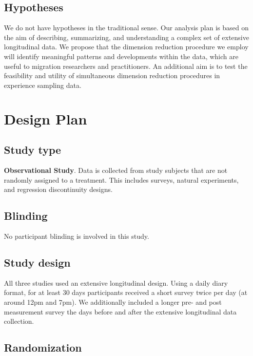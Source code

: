 \documentclass[]{article}
\begin{document}
\hypertarget{hypotheses}{%
\subsection{Hypotheses}\label{hypotheses}}

We do not have hypotheses in the traditional sense. Our analysis plan is
based on the aim of describing, summarizing, and understanding a complex
set of extensive longitudinal data. We propose that the dimension
reduction procedure we employ will identify meaningful patterns and
developments within the data, which are useful to migration researchers
and practitioners. An additional aim is to test the feasibility and
utility of simultaneous dimension reduction procedures in experience
sampling data.

\hypertarget{design-plan}{%
\section{Design Plan}\label{design-plan}}

\hypertarget{study-type}{%
\subsection{Study type}\label{study-type}}

\textbf{Observational Study}. Data is collected from study subjects that
are not randomly assigned to a treatment. This includes surveys, natural
experiments, and regression discontinuity designs.

\hypertarget{blinding}{%
\subsection{Blinding}\label{blinding}}

No participant blinding is involved in this study.

\hypertarget{study-design}{%
\subsection{Study design}\label{study-design}}

All three studies used an extensive longitudinal design. Using a daily
diary format, for at least 30 days participants received a short survey
twice per day (at around 12pm and 7pm). We additionally included a
longer pre- and post measurement survey the days before and after the
extensive longitudinal data collection.

\hypertarget{randomization}{%
\subsection{Randomization}\label{randomization}}
\end{document}
